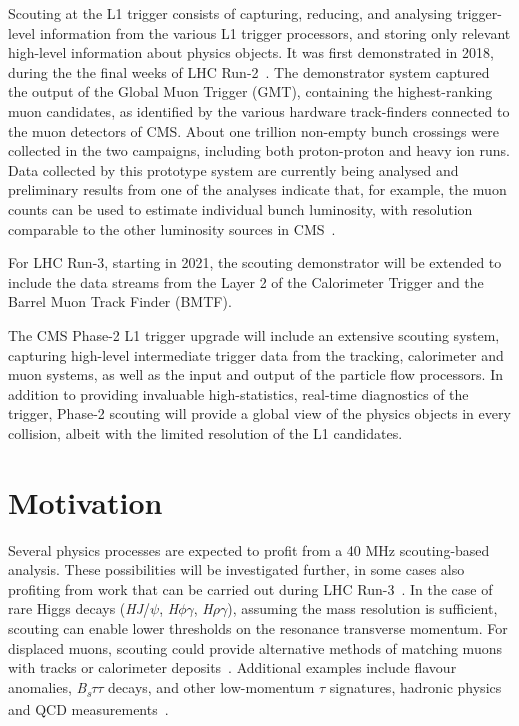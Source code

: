 \documentclass[10pt, paper=a4, UKenglish]{article}
\begin{document}
Scouting at the L1 trigger consists of capturing, reducing, and analysing trigger-level information from the various L1 trigger processors, and storing only relevant high-level information about physics objects. It was first demonstrated in 2018, during the the final weeks of LHC Run-2~\cite{hannes}. The demonstrator system captured the output of the Global Muon Trigger (GMT), containing the highest-ranking muon candidates, as identified by the various hardware track-finders connected to the muon detectors of CMS. About one trillion non-empty bunch crossings were collected in the two campaigns, including both proton-proton and heavy ion runs. Data collected by this prototype system are currently being analysed and preliminary results from one of the analyses indicate that, for example, the muon counts can be used to estimate individual bunch luminosity, with resolution comparable to the other luminosity sources in CMS~\cite{tdr, lumi}.

For LHC Run-3, starting in 2021, the scouting demonstrator will be extended to include the data streams from the Layer 2 of the Calorimeter Trigger and the Barrel Muon Track Finder (BMTF).

The CMS Phase-2 L1 trigger upgrade will include an extensive scouting system, capturing high-level intermediate trigger data from the tracking, calorimeter and muon systems, as well as the input and output of the particle flow processors. In addition to providing invaluable high-statistics, real-time diagnostics of the trigger, Phase-2 scouting will provide a global view of the physics objects in every collision, albeit with the limited resolution of the L1 candidates.

\section{Motivation}
\label{Motivation}

Several physics processes are expected to profit from a 40 MHz scouting-based analysis. These possibilities will be investigated further, in some cases also profiting from work that can be carried out during LHC Run-3~\cite{tdr}. In the case of rare Higgs decays (\textit{H}\textrightarrow \textit{J}/$\psi$, \textit{H}\textrightarrow $\phi\gamma$, \textit{H}\textrightarrow $\rho\gamma$), assuming the mass resolution is sufficient, scouting can enable lower thresholds on the resonance transverse momentum. For displaced muons, scouting could provide alternative methods of matching muons with tracks or calorimeter deposits~\cite{hannes}. Additional examples include flavour anomalies, \textit{B\textsubscript{s}}\textrightarrow $\tau\tau$ decays, and other low-momentum $\tau$ signatures, hadronic physics and QCD measurements~\cite{tdr}.
\end{document}
